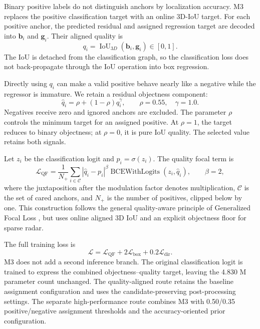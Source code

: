 \documentclass[final,5p,times]{elsarticle}
\begin{document}
Binary positive labels do not distinguish anchors by localization accuracy.
M3 replaces the positive classification target with an online 3D-IoU target.
For each positive anchor, the predicted residual and assigned regression
target are decoded into $\mathbf{b}_i$ and $\mathbf{g}_i$. Their aligned
quality is
\begin{equation}
q_i=\operatorname{IoU}_{3D}(\mathbf{b}_i,\mathbf{g}_i)\in[0,1].
\end{equation}
The IoU is detached from the classification graph, so the classification loss
does not back-propagate through the IoU operation into box regression.

Directly using $q_i$ can make a valid positive behave nearly like a negative
while the regressor is immature. We retain a residual objectness component:
\begin{equation}
\widehat q_i=\rho+(1-\rho)q_i^\gamma,
\qquad \rho=0.55,\quad \gamma=1.0.
\label{eq:quality-target}
\end{equation}
Negatives receive zero and ignored anchors are excluded. The parameter $\rho$
controls the minimum target for an assigned positive. At $\rho=1$, the target
reduces to binary objectness; at $\rho=0$, it is pure IoU quality. The selected
value retains both signals.

Let $z_i$ be the classification logit and $p_i=\sigma(z_i)$. The quality focal
term is
\begin{equation}
\mathcal{L}_{\mathrm{QF}} =
\frac{1}{N_+}\sum_{i\in\mathcal{C}}
\left|\widehat q_i-p_i\right|^\beta
\operatorname{BCEWithLogits}(z_i,\widehat q_i),
\qquad \beta=2,
\end{equation}
where the juxtaposition after the modulation factor denotes multiplication,
$\mathcal{C}$ is the set of cared anchors, and $N_+$ is the number of
positives, clipped below by one. This construction follows the general
quality-aware principle of Generalized Focal Loss
\cite{li2022gfl}, but uses online aligned 3D IoU and an explicit objectness
floor for sparse radar.

The full training loss is
\begin{equation}
\mathcal{L}=\mathcal{L}_{\mathrm{QF}}
+2\mathcal{L}_{\mathrm{box}}+0.2\mathcal{L}_{\mathrm{dir}}.
\end{equation}
M3 does not add a second inference branch. The original classification logit
is trained to express the combined objectness--quality target, leaving the
4.830 M parameter count unchanged. The quality-aligned route retains the
baseline assignment configuration and uses the candidate-preserving
post-processing settings. The separate high-performance route combines M3
with 0.50/0.35 positive/negative assignment thresholds and the
accuracy-oriented prior configuration.
\end{document}
